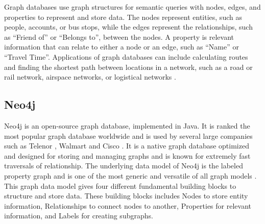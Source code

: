 

Graph databases use graph structures for semantic queries with nodes, edges, and properties to represent and store data.
The nodes represent entities, such as people, accounts, or bus stops, while the edges represent the relationships, such as ``Friend of'' or ``Belongs to'', between the nodes. A property is relevant information that can relate to either a node or an edge, such as ``Name'' or ``Travel Time''.
Applications of graph databases can include calculating routes and finding the shortest path between locations in a network, such as a road or rail network, airspace networks, or logistical networks \citep[p.102]{robinson13}. 

\subsection{Neo4j}
\label{subsubsec:neo4j}
Neo4j \citep{website:neo4j} is an open-source graph database, implemented in Java. It is ranked the most popular graph database worldwide \citep{website:graphdbranking} and is used by several large companies such as Telenor \citep{website:telenor}, Walmart \citep{website:walmart} and Cisco \citep{website:cisco}. It is a native graph database optimized and designed for storing and managing graphs and is known for extremely fast traversals of relationship. The underlying data model of Neo4j is the labeled property graph and is one of the most generic and versatile of all graph models \citep[p.73]{robinson13}. This graph data model gives four different fundamental building blocks to structure and store data. These building blocks includes Nodes to store entity information, Relationships to connect nodes to another, Properties for relevant information, and Labels for creating subgraphs.


